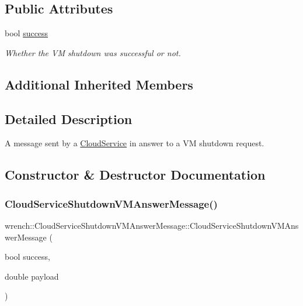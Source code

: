 \subsection*{Public Attributes}
\begin{DoxyCompactItemize}
\item 
\mbox{\label{classwrench_1_1_cloud_service_shutdown_v_m_answer_message_a02e43776e1b8ca2c19c867fa73e8edf2}} 
bool \hyperlink{classwrench_1_1_cloud_service_shutdown_v_m_answer_message_a02e43776e1b8ca2c19c867fa73e8edf2}{success}
\begin{DoxyCompactList}\small\item\em Whether the VM shutdown was successful or not. \end{DoxyCompactList}\end{DoxyCompactItemize}
\subsection*{Additional Inherited Members}


\subsection{Detailed Description}
A message sent by a \hyperlink{classwrench_1_1_cloud_service}{Cloud\+Service} in answer to a VM shutdown request. 

\subsection{Constructor \& Destructor Documentation}
\mbox{\label{classwrench_1_1_cloud_service_shutdown_v_m_answer_message_a4990c25b9659298f72203f528cb22e79}} 
\subsubsection{\texorpdfstring{Cloud\+Service\+Shutdown\+V\+M\+Answer\+Message()}{CloudServiceShutdownVMAnswerMessage()}}
{\footnotesize\ttfamily wrench\+::\+Cloud\+Service\+Shutdown\+V\+M\+Answer\+Message\+::\+Cloud\+Service\+Shutdown\+V\+M\+Answer\+Message (\begin{DoxyParamCaption}\item[{bool}]{success,  }\item[{double}]{payload }\end{DoxyParamCaption})}



